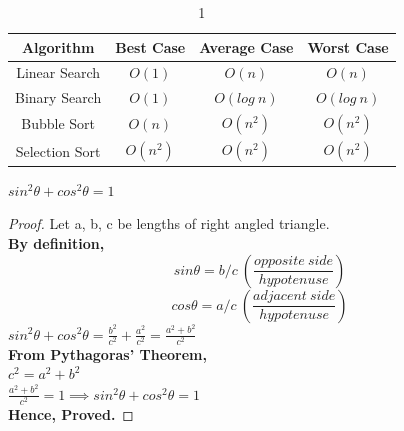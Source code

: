 \documentclass{beamer}       %
\begin{document}
\begin{frame}
    \begin{table}           %
        \centering
        \begin{tabular}{|c|c|c|c|}
             \hline
             Algorithm & Best Case & Average Case & Worst Case  \\ 
             \hline \hline
             Linear Search & $O(1)$ & $O(n)$ & $O(n)$ \\
             \hline
             Binary Search & $O(1)$ & $O(log~n)$ & $O(log~n)$ \\
             \hline
             Bubble Sort & $O(n)$ & $O(n^2)$ & $O(n^2)$ \\
             \hline
             Selection Sort & $O(n^2)$ & $O(n^2)$ & $O(n^2)$ \\
             \hline
        \end{tabular}
        \caption{1}
        \label{tab:table1}
    \end{table}
    \begin{theorem}
    $sin^2\theta + cos^2\theta = 1$
    \end{theorem}
\end{frame}

\begin{frame}
\begin{proof}               %
 Let a, b, c be lengths of right angled triangle.\\
\textbf{By definition,}
$$ sin\theta = b/c~\left(\frac{opposite~side}{hypotenuse}\right) $$
$$ cos\theta = a/c~\left(\frac{adjacent~side}{hypotenuse}\right) $$
$sin^2\theta + cos^2\theta = \frac{b^2}{c^2} + \frac{a^2}{c^2} = \frac{a^2 + b^2}{c^2}$ \\ \vspace{4mm}
\textbf{From Pythagoras' Theorem,} \\ \vspace{4mm}
$c^2 = a^2 + b^2$ \\ \vspace{4mm}
$\frac{a^2 + b^2}{c^2} = 1 \implies sin^2\theta + cos^2\theta = 1$ \\ \vspace{4mm}
\textbf{Hence, Proved.}
\end{proof}
\end{frame}
\end{document}
